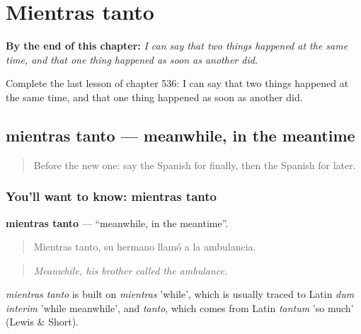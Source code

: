 
\chapter{Mientras tanto}
\label{ch:es-mientras-tanto}

\begin{chapteropening}
\textbf{By the end of this chapter:} \emph{I can say that two things happened at the same time, and that one thing happened as soon as another did.}

Complete the last lesson of chapter 536: I can say that two things happened at the same time, and that one thing happened as soon as another did.
\end{chapteropening}

\section[mientras tanto]{mientras tanto — meanwhile, in the meantime}

\label{lesson:ES-C536-mientras-tanto}



\begin{quote}
Before the new one: say the Spanish for finally, then the Spanish for later.
\end{quote}

\subsection*{You'll want to know: mientras tanto}
\textbf{mientras tanto} — \textquotedblleft{}meanwhile, in the meantime\textquotedblright{}.

\begin{quote}
Mientras tanto, su hermano llamó a la ambulancia.
\end{quote}

\begin{quote}
\emph{Meanwhile, his brother called the ambulance.}
\end{quote}

\begin{cousinweb}
\emph{mientras tanto} is built on \emph{mientras} 'while', which is usually traced to Latin \emph{dum interim} 'while meanwhile', and \emph{tanto}, which comes from Latin \emph{tantum} 'so much' (Lewis \& Short).
\end{cousinweb}

